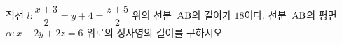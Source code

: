직선 $l\colon \dfrac{x+3}{2}=y+4=\dfrac{z+5}{2}$ 위의 선분~$\mathrm{AB}$의 길이가 $18$이다. 선분~$\mathrm{AB}$의 평면 $\alpha\colon x-2y+2z=6$ 위로의 정사영의 길이를 구하시오.
